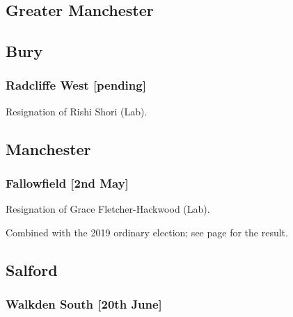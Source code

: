 \documentclass[a4paper,openany]{book}
\begin{document}
\begin{resultsiii}
\section{Greater Manchester}

\subsection*{Bury}

\subsubsection*{Radcliffe West \hspace*{\fill}\nolinebreak[1]%
	\enspace\hspace*{\fill}
	[pending]}


Resignation of Rishi Shori (Lab).

\subsection*{Manchester}

\subsubsection*{Fallowfield \hspace*{\fill}\nolinebreak[1]%
	\enspace\hspace*{\fill}
	[2nd May]}


Resignation of Grace Fletcher-Hackwood (Lab).

Combined with the 2019 ordinary election; see page \pageref{ManchesterFallowfield} for the result.

\subsection*{Salford}

\subsubsection*{Walkden South \hspace*{\fill}\nolinebreak[1]%
	\enspace\hspace*{\fill}
	[20th June]}


\end{resultsiii}
\end{document}
